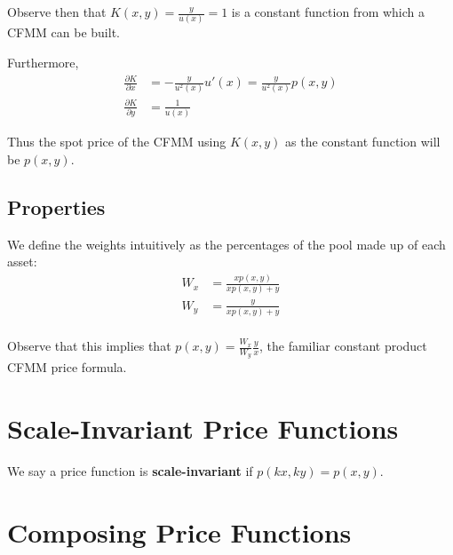 \documentclass[11pt]{article} %
\begin{document}
Observe then that $K(x,y) = \frac{y}{u(x)} = 1$ is a constant function from which a CFMM can be built.

Furthermore,
\begin{align*}
\frac{\partial K}{\partial x} &= -\frac{y}{u^2(x)}u'(x) = \frac{y}{u^2(x)}p(x,y)\\
\frac{\partial K}{\partial y} &= \frac{1}{u(x)}
\end{align*}

Thus the spot price of the CFMM using $K(x,y)$ as the constant function will be $p(x,y)$.


\subsection{Properties}

We define the weights intuitively as the percentages of the pool made up of each asset:
\begin{align*}
W_x &= \frac{xp(x,y)}{xp(x,y) + y}\\
W_y &= \frac{y}{xp(x,y) + y}\\
\end{align*}

Observe that this implies that $p(x,y) = \frac{W_x}{W_y}\frac{y}{x}$, the familiar constant product CFMM price formula.

\section{Scale-Invariant Price Functions}

We say a price function is \textbf{scale-invariant} if $p(kx,ky) = p(x,y)$.

\section{Composing Price Functions}





\end{document}
